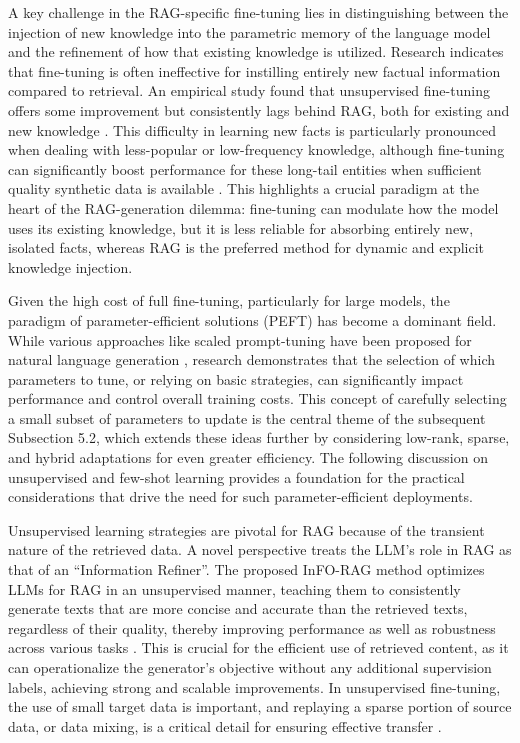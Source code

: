 \documentclass[11pt]{article}
\begin{document}
A key challenge in the RAG-specific fine-tuning lies in distinguishing between the injection of new knowledge into the parametric memory of the language model and the refinement of how that existing knowledge is utilized. Research indicates that fine-tuning is often ineffective for instilling entirely new factual information compared to retrieval. An empirical study found that unsupervised fine-tuning offers some improvement but consistently lags behind RAG, both for existing and new knowledge \cite{ref30}. This difficulty in learning new facts is particularly pronounced when dealing with less-popular or low-frequency knowledge, although fine-tuning can significantly boost performance for these long-tail entities when sufficient quality synthetic data is available \cite{ref25}. This highlights a crucial paradigm at the heart of the RAG-generation dilemma: fine-tuning can modulate how the model uses its existing knowledge, but it is less reliable for absorbing entirely new, isolated facts, whereas RAG is the preferred method for dynamic and explicit knowledge injection.

Given the high cost of full fine-tuning, particularly for large models, the paradigm of parameter-efficient solutions (PEFT) has become a dominant field. While various approaches like scaled prompt-tuning have been proposed for natural language generation \cite{ref200}, research demonstrates that the selection of which parameters to tune, or relying on basic strategies, can significantly impact performance and control overall training costs. This concept of carefully selecting a small subset of parameters to update is the central theme of the subsequent Subsection 5.2, which extends these ideas further by considering low-rank, sparse, and hybrid adaptations for even greater efficiency. The following discussion on unsupervised and few-shot learning provides a foundation for the practical considerations that drive the need for such parameter-efficient deployments.

Unsupervised learning strategies are pivotal for RAG because of the transient nature of the retrieved data. A novel perspective treats the LLM's role in RAG as that of an ``Information Refiner''. The proposed InFO-RAG method optimizes LLMs for RAG in an unsupervised manner, teaching them to consistently generate texts that are more concise and accurate than the retrieved texts, regardless of their quality, thereby improving performance as well as robustness across various tasks \cite{ref201}. This is crucial for the efficient use of retrieved content, as it can operationalize the generator's objective without any additional supervision labels, achieving strong and scalable improvements. In unsupervised fine-tuning, the use of small target data is important, and replaying a sparse portion of source data, or data mixing, is a critical detail for ensuring effective transfer \cite{ref202}.
\end{document}
